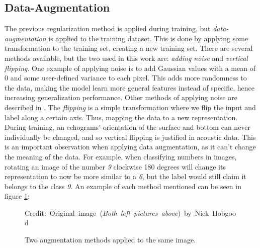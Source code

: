 \subsection{Data-Augmentation} \label{data-augmentation}
    The previous regularization method is applied during training, but \textit{data-augmentation} is applied to the training dataset\cite{kukavcka2017_regularization}. This is done by applying some transformation to the training set, creating a new training set. There are several methods available, but the two used in this work are: \textit{adding noise} and \textit{vertical flipping}. One example of applying noise is to add Gaussian values with a mean of 0 and some user-defined variance to each pixel. This adds more randomness to the data, making the model learn more general features instead of specific, hence increasing generalization performance. Other methods of applying noise are described in \citeauthor{kukavcka2017_regularization}\cite{kukavcka2017_regularization}. The \textit{flipping} is a simple transformation where we flip the input and label along a certain axis. Thus, mapping the data to a new representation. During training, an echograms' orientation of the surface and bottom can never individually be changed, and so vertical flipping is justified in acoustic data. This is an important observation when applying data augmentation, as it can't change the meaning of the data. For example, when classifying numbers in images, rotating an image of the number \textit{9} clockwise 180 degrees will change its representation to now be more similar to a \textit{6}, but the label would still claim it belongs to the class \textit{9}. An example of each method mentioned can be seen in figure \ref{data augmentation fig}:
    
    \begin{figure}[H]
        \centering
        
        
        
        
        \caption[Two data augmentation examples]{Two augmentation methods applied to the same image.}
        \medskip 
        \hspace*{15pt}\hbox{\scriptsize Credit: Original image (\textit{Both left pictures above}) by Nick Hobgood\cite{clownfish_image}}
        \label{data augmentation fig}
        
        \end{figure}
    
